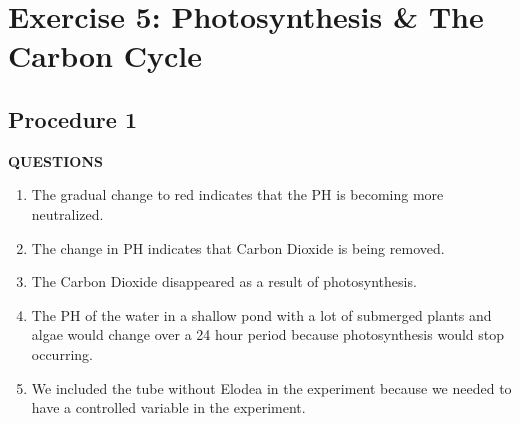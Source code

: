 \documentclass{article}
\begin{document}
\newcommand{\hr}{\par\noindent\rule{\textwidth}{0.4pt}}

\newcommand{\bc}[1]{
	\begin{equation*}
		\begin{boxed}
			{#1}
		\end{boxed}
	\end{equation*}
}

\newcommand{\cond}[2]{
	\ifmmode
		{#1} \quad {#2}
	\else
		$$ {#1} \quad {#2} $$
	\fi
}

\tableofcontents

\section{Exercise 5: Photosynthesis \& The Carbon Cycle}

\subsection{Procedure 1}
\textbf{QUESTIONS}
\begin{enumerate}[label=\textbf{\arabic*.}]
	\item The gradual change to red indicates that the PH is becoming more neutralized.
	\item The change in PH indicates that Carbon Dioxide is being removed.
	\item The Carbon Dioxide disappeared as a result of photosynthesis.
	\item The PH of the water in a shallow pond with a lot of submerged plants and algae would change over a 24 hour period because photosynthesis would stop occurring.
	\item We included the tube without Elodea in the experiment because we needed to have a controlled variable in the experiment.
\end{enumerate}
\end{document}
